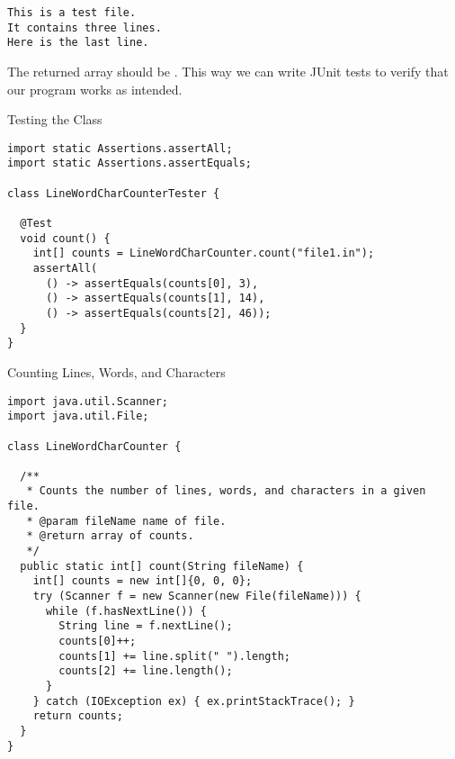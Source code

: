 
\par{
\begin{verbatim}
This is a test file.
It contains three lines.
Here is the last line.
\end{verbatim}
}
The returned array should be \ttt{[3, 14, 46]}. This way we can write JUnit tests to verify that our program works as intended.

\begin{cl}{Testing the  Class}
\begin{lstlisting}[language=MyJava]
import static Assertions.assertAll;
import static Assertions.assertEquals;

class LineWordCharCounterTester {

  @Test
  void count() {
    int[] counts = LineWordCharCounter.count("file1.in");
    assertAll(
      () -> assertEquals(counts[0], 3),
      () -> assertEquals(counts[1], 14),
      () -> assertEquals(counts[2], 46));
  }
}
\end{lstlisting}
\end{cl}

\begin{cl}{Counting Lines, Words, and Characters}
\begin{lstlisting}[language=MyJava]
import java.util.Scanner;
import java.util.File;

class LineWordCharCounter {

  /**
   * Counts the number of lines, words, and characters in a given file.
   * @param fileName name of file.
   * @return array of counts.
   */
  public static int[] count(String fileName) {
    int[] counts = new int[]{0, 0, 0};
    try (Scanner f = new Scanner(new File(fileName))) {
      while (f.hasNextLine()) {
        String line = f.nextLine();
        counts[0]++;
        counts[1] += line.split(" ").length;
        counts[2] += line.length();
      }
    } catch (IOException ex) { ex.printStackTrace(); }
    return counts;
  }
}
\end{lstlisting}
\end{cl}

